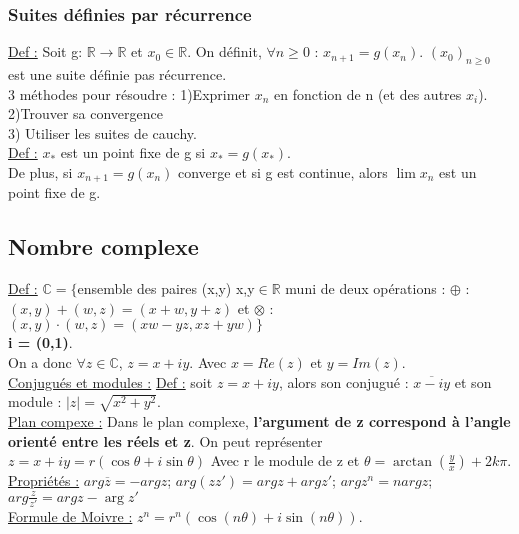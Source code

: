 \documentclass[../main.tex]{subfiles}
\begin{document}
\subsubsection{Suites définies par récurrence}
\underline{Def :} Soit g: $\mathbb{R} \rightarrow \mathbb{R}$ et $x_0 \in \mathbb{R}$. On définit, $\forall n \geq 0$ : $x_{n+1} = g(x_n)$. $(x_0)_{n\geq 0}$ est une suite définie pas récurrence.\\

3 méthodes pour résoudre : 1)Exprimer $x_n$ en fonction de n (et des autres $x_i$).\\
2)Trouver sa convergence \\
3) Utiliser les suites de cauchy.\\

\underline{Def :} $x_*$ est un point fixe de g si $x_* = g(x_*)$.\\
De plus, si $x_{n+1} = g(x_n)$ converge et si g est continue, alors $\lim x_n$ est un point fixe de g.\\


\subsection{Nombre complexe}
\underline{Def :} $\mathbb{C} = \{$ensemble des paires (x,y) x,y$\in \mathbb{R}$ muni de deux opérations : $\oplus$ : $(x, y)+(w,z) = (x+w, y+z)$ et $\otimes$ : $(x,y)\cdot (w,z) = (xw-yz, xz+yw)\}$\\

\textbf{i = (0,1)}.\\
On a donc $\forall z \in \mathbb{C}$, $z=x+iy$. Avec $x = Re(z)$ et $y=Im(z)$.\\

\quad \underline{Conjugués et modules :}
\underline{Def :} soit $z = x+iy$, alors son conjugué : $\overline{x-iy}$ et son module : $|z| = \sqrt{x^2 + y^2}$.\\

\quad \underline{Plan compexe :} Dans le plan complexe, \textbf{l'argument de z correspond à l'angle orienté entre les réels et z}. On peut représenter $z=x+iy = r(\cos{\theta} + i\sin{\theta})$ Avec r le module de z et $\theta = \arctan(\frac{y}{x}) + 2k\pi$.\\

\underline{Propriétés :} $arg \overline{z} = -arg z$; $arg(z z') = argz + arg z'$; $arg z^n = n arg z$; $arg \frac{z}{z'} = arg z - \arg z'$\\

\quad \underline{Formule de Moivre :} $z^n = r^n(\cos(n\theta) + i \sin(n\theta))$.\\
\end{document}
